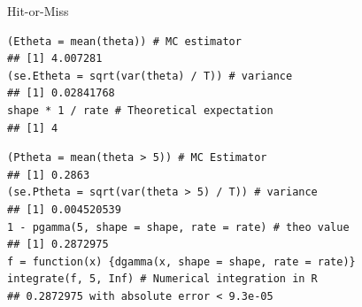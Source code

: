 \documentclass[11pt,compress,t,notes=noshow, xcolor=table]{beamer}
\begin{document}
\begin{vbframe}{Hit-or-Miss}
%

\begin{verbatim}
(Etheta = mean(theta)) # MC estimator
## [1] 4.007281
(se.Etheta = sqrt(var(theta) / T)) # variance
## [1] 0.02841768
shape * 1 / rate # Theoretical expectation
## [1] 4
\end{verbatim}


%

\begin{verbatim}
(Ptheta = mean(theta > 5)) # MC Estimator
## [1] 0.2863
(se.Ptheta = sqrt(var(theta > 5) / T)) # variance
## [1] 0.004520539
1 - pgamma(5, shape = shape, rate = rate) # theo value
## [1] 0.2872975
f = function(x) {dgamma(x, shape = shape, rate = rate)}
integrate(f, 5, Inf) # Numerical integration in R
## 0.2872975 with absolute error < 9.3e-05
\end{verbatim}










\end{vbframe}
\end{document}
